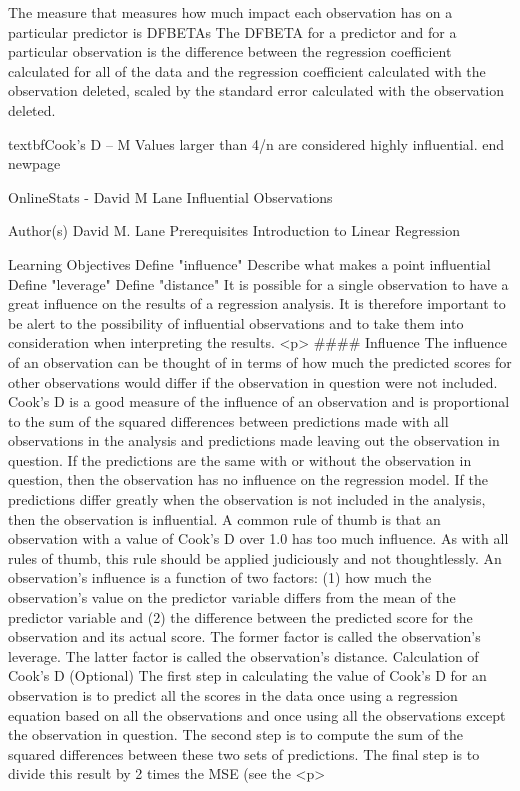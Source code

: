 	The measure that measures how much impact each observation has on a particular predictor is DFBETAs The DFBETA for a predictor and for a particular observation is the difference between the regression coefficient calculated for all of the data and the regression coefficient calculated with the observation deleted, scaled by the standard error calculated with the observation deleted. 
	
	      	textbf{Cook’s D} – M Values larger than 4/n are considered highly influential.
end{ }
newpage

OnlineStats - David M Lane
Influential Observations

Author(s)
David M. Lane
Prerequisites
Introduction to Linear Regression

Learning Objectives
Define "influence"
Describe what makes a point influential
Define "leverage"
Define "distance"
It is possible for a single observation to have a great influence on the results of a regression analysis. It is therefore important to be alert to the possibility of influential observations and to take them into consideration when interpreting the results.
<p>
####      {Influence}
The influence of an observation can be thought of in terms of how much the predicted scores for other observations would differ if the observation in question were not included. Cook's D is a good measure of the influence of an observation and is proportional to the sum of the squared differences between predictions made with all observations in the analysis and predictions made leaving out the observation in question. If the predictions are the same with or without the observation in question, then the observation has no influence on the regression model. If the predictions differ greatly when the observation is not included in the analysis, then the observation is influential.
A common rule of thumb is that an observation with a value of Cook's D over 1.0 has too much influence. As with all rules of thumb, this rule should be applied judiciously and not thoughtlessly.
An observation's influence is a function of two factors: (1) how much the observation's value on the predictor variable differs from the mean of the predictor variable and (2) the difference between the predicted score for the observation and its actual score. The former factor is called the observation's leverage. The latter factor is called the observation's distance.
Calculation of Cook's D (Optional)
The first step in calculating the value of Cook's D for an observation is to predict all the scores in the data once using a regression equation based on all the observations and once using all the observations except the observation in question. The second step is to compute the sum of the squared differences between these two sets of predictions. The final step is to divide this result by 2 times the MSE (see the <p>
